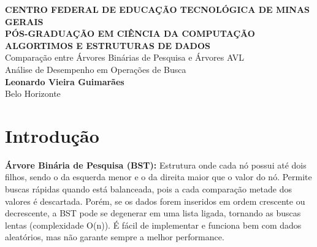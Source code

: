 \documentclass[12pt,a4paper]{article}
\begin{document}
\begin{titlepage}
    \begin{center}
        \vspace*{2cm}
        \textbf{CENTRO FEDERAL DE EDUCAÇÃO TECNOLÓGICA DE MINAS GERAIS} \\[1.5cm]
        \textbf{PÓS-GRADUAÇÃO EM CIÊNCIA DA COMPUTAÇÃO} \\[4cm]
        \textbf{ALGORTIMOS E ESTRUTURAS DE DADOS} \\[0.5cm]
        \large{Comparação entre Árvores Binárias de Pesquisa e Árvores AVL} \\[0.5cm]
        \large{Análise de Desempenho em Operações de Busca} \\[4cm]
        \textbf{Leonardo Vieira Guimarães} \\[2cm]
        Belo Horizonte \\[0.5cm]
        \the\year
    \end{center}
\end{titlepage}


\begin{abstract}
Este trabalho compara, de forma simples e prática, duas estruturas muito usadas para busca de dados: a Árvore Binária de Pesquisa (BST) e a Árvore AVL. A BST é fácil de entender, mas pode ficar lenta se os dados forem inseridos em ordem. Já a AVL se ajusta automaticamente, mantendo sempre a busca rápida, mesmo com dados ordenados. Foram realizados experimentos com diferentes tamanhos de árvore (de 1.000 a 10.000 elementos) e dois tipos de inserção: ordenada e aleatória. Os resultados mostram que a AVL garante eficiência em todos os casos, enquanto a BST só é eficiente com dados aleatórios. Assim, o estudo reforça a importância do balanceamento automático para manter a velocidade das buscas.

\textbf{Palavras-chave:} BST, AVL, Estruturas de Dados, Busca, Complexidade, Algoritmos.
\end{abstract}

\newpage
\tableofcontents
\newpage

\section{Introdução}



\textbf{Árvore Binária de Pesquisa (BST):} Estrutura onde cada nó possui até dois filhos, sendo o da esquerda menor e o da direita maior que o valor do nó. Permite buscas rápidas quando está balanceada, pois a cada comparação metade dos valores é descartada. Porém, se os dados forem inseridos em ordem crescente ou decrescente, a BST pode se degenerar em uma lista ligada, tornando as buscas lentas (complexidade O(n)). É fácil de implementar e funciona bem com dados aleatórios, mas não garante sempre a melhor performance.
\end{document}
